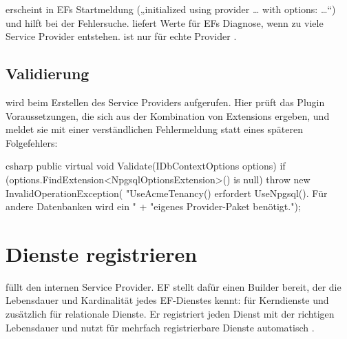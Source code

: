  erscheint in EFs Startmeldung („initialized using provider …
with options: …“) und hilft bei der Fehlersuche.
 liefert Werte für EFs Diagnose, wenn zu
viele Service Provider entstehen.  ist
nur für echte Provider .

\section{Validierung}

 wird beim Erstellen des Service Providers aufgerufen. Hier prüft das Plugin
Voraussetzungen, die sich aus der Kombination von Extensions ergeben, und meldet sie mit
einer verständlichen Fehlermeldung statt eines späteren Folgefehlers:

\begin{sourcecode}{csharp}
public virtual void Validate(IDbContextOptions options)
{
    if (options.FindExtension<NpgsqlOptionsExtension>() is null)
        throw new InvalidOperationException(
            "UseAcmeTenancy() erfordert UseNpgsql(). Für andere Datenbanken wird ein "
            + "eigenes Provider-Paket benötigt.");
}
\end{sourcecode}

\chapter{Dienste registrieren}\label{ch:registering-services}

 füllt den internen Service Provider. EF stellt dafür einen
Builder bereit, der die Lebensdauer und Kardinalität jedes EF-Dienstes kennt:
 für Kerndienste
und
zusätzlich für relationale Dienste. Er registriert jeden Dienst mit der richtigen
Lebensdauer und nutzt für mehrfach registrierbare Dienste automatisch
.

